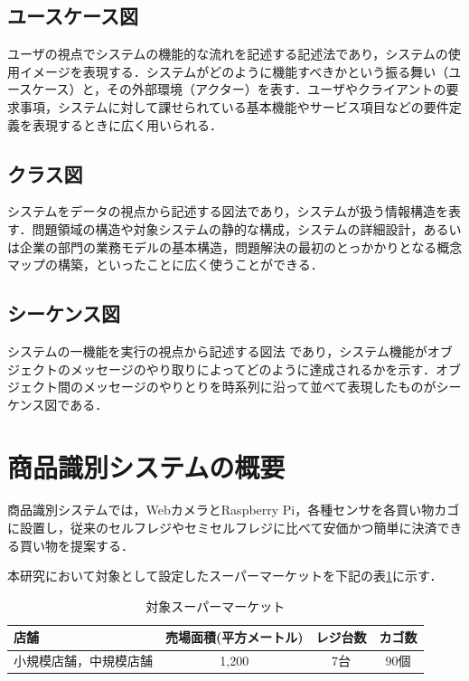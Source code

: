 \subsection*{ユースケース図}

ユーザの視点でシステムの機能的な流れを記述する記述法\cite{soft}であり，システムの使用イメージを表現する．システムがどのように機能すべきかという振る舞い（ユースケース）と，その外部環境（アクター）を表す．ユーザやクライアントの要求事項，システムに対して課せられている基本機能やサービス項目などの要件定義を表現するときに広く用いられる\cite{uml}．

\subsection*{クラス図}

システムをデータの視点から記述する図法\cite{soft}であり，システムが扱う情報構造を表す．問題領域の構造や対象システムの静的な構成，システムの詳細設計，あるいは企業の部門の業務モデルの基本構造，問題解決の最初のとっかかりとなる概念マップの構築，といったことに広く使\cite{uml}うことができる．

\subsection*{シーケンス図}

システムの一機能を実行の視点から記述する図法\cite{soft}	であり，システム機能がオブジェクトのメッセージのやり取りによってどのように達成されるかを示す．オブジェクト間のメッセージのやりとりを時系列に沿って並べて表現したもの\cite{uml}がシーケンス図である．


\section{商品識別システムの概要}

商品識別システムでは，WebカメラとRaspberry Pi，各種センサを各買い物カゴに設置し，従来のセルフレジやセミセルフレジに比べて安価かつ簡単に決済できる買い物を提案する．

本研究において対象として設定したスーパーマーケットを下記の表\ref{taisho}に示す．


\begin{table}[htb]
\begin{center}
\caption{対象スーパーマーケット}
\begin{tabular}{|l|c|c|c|} \hline
店舗 & 売場面積(平方メートル) & レジ台数 & カゴ数 \\ \hline
小規模店舗，中規模店舗 & 1,200 & 7台 & 90個 \\ \hline
\end{tabular}
\label{taisho}
\end{center}
\end{table}


